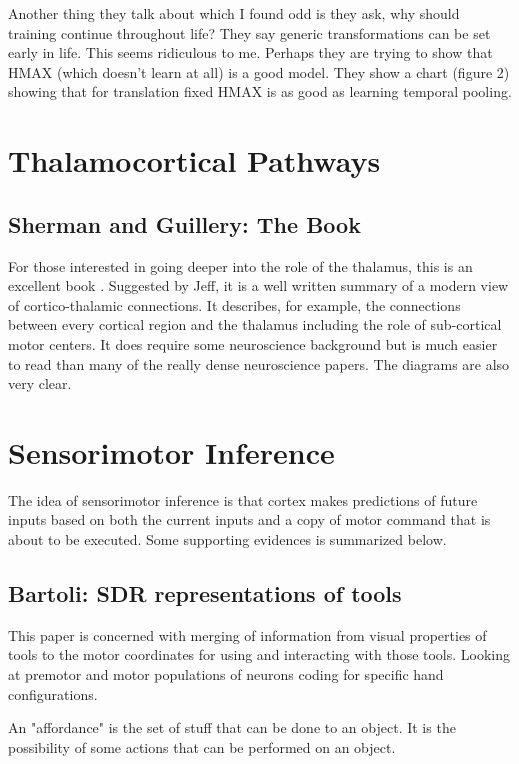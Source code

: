 \documentclass{article} %
\begin{document}
Another thing they talk about which I found odd is they ask, why should
training continue throughout life?  They say generic transformations can be set
early in life.  This seems ridiculous to me.  Perhaps they are trying to show
that HMAX (which doesn't learn at all) is a good model.  They show a chart
(figure 2) showing that for translation fixed HMAX is as good as learning
temporal pooling.


\section{Thalamocortical Pathways}

\subsection{Sherman and Guillery: The Book}

For those interested in going deeper into the role of the thalamus, this is an
excellent book \cite{Sherman}. Suggested by Jeff, it is a well written summary
of a modern view of cortico-thalamic connections. It describes, for example, the
connections between every cortical region and the thalamus including the role of
sub-cortical motor centers. It does require some neuroscience background but is
much easier to read than many of the really dense neuroscience papers. The
diagrams are also very clear.

\section{Sensorimotor Inference}

The idea of sensorimotor inference is that cortex makes predictions of future
inputs based on both the current inputs and a copy of motor command that is
about to be executed.  Some supporting evidences is summarized below.

\subsection{Bartoli: SDR representations of tools}

This paper \cite{Bartoli2014} is concerned with merging of information from
visual properties of tools to the motor coordinates for using and interacting
with those tools. Looking at premotor and motor populations of neurons coding
for specific hand configurations.

An "affordance" is the set of stuff that can be done to an object.  It is the
possibility of some actions that can be performed on an object.
\end{document}
